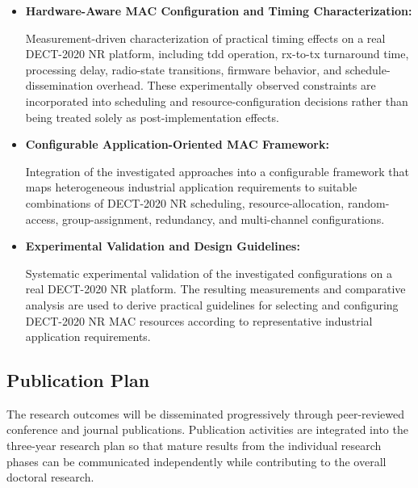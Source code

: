 \documentclass[12pt,a4paper]{article}
\begin{document}
\begin{itemize}
Application-oriented configuration of transmission opportunities, reception
windows, and sleep intervals for battery-powered devices. The investigation
characterizes the relationship among application reporting intervals,
maximum tolerable latency, device activity, and achievable sleep duration,
providing a basis for energy-aware DECT-2020 NR operation.

\item \textbf{Hardware-Aware MAC Configuration and Timing Characterization:}

Measurement-driven characterization of practical timing effects on a real
DECT-2020 NR platform, including \gls{tdd} operation,
\gls{rx}-to-\gls{tx} turnaround time, processing delay, radio-state
transitions, firmware behavior, and schedule-dissemination overhead. These
experimentally observed constraints are incorporated into scheduling and
resource-configuration decisions rather than being treated solely as
post-implementation effects.

\item \textbf{Configurable Application-Oriented MAC Framework:}

Integration of the investigated approaches into a configurable framework that
maps heterogeneous industrial application requirements to suitable
combinations of DECT-2020 NR scheduling, resource-allocation, random-access,
group-assignment, redundancy, and multi-channel configurations. 

\item \textbf{Experimental Validation and Design Guidelines:}

Systematic experimental validation of the investigated configurations on a
real DECT-2020 NR platform. The resulting measurements and comparative
analysis are used to derive practical guidelines for selecting and configuring
DECT-2020 NR MAC resources according to representative industrial application
requirements.

\end{itemize}


\subsection{Publication Plan}
\label{subsec:publication_plan}

The research outcomes will be disseminated progressively through peer-reviewed
conference and journal publications. Publication activities are integrated
into the three-year research plan so that mature results from the individual
research phases can be communicated independently while contributing to the
overall doctoral research.
\end{document}
